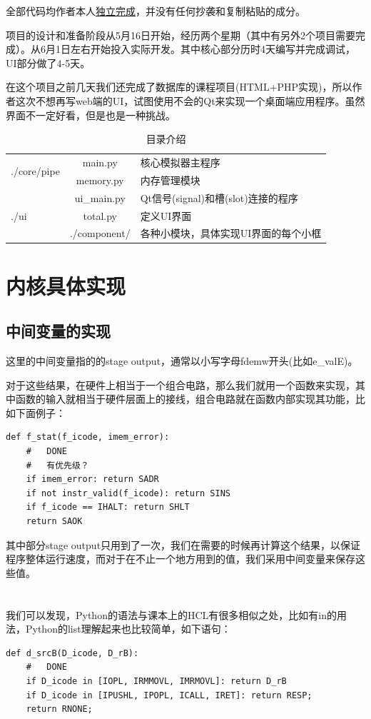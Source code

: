 \documentclass{article}
\begin{document}
全部代码均作者本人\underline{独立完成}，并没有任何抄袭和复制粘贴的成分。

项目的设计和准备阶段从5月16日开始，经历两个星期（其中有另外2个项目需要完成）。从6月1日左右开始投入实际开发。其中核心部分历时4天编写并完成调试，UI部分做了4-5天。

在这个项目之前几天我们还完成了数据库的课程项目(HTML+PHP实现)，所以作者这次不想再写web端的UI，试图使用不会的Qt来实现一个桌面端应用程序。虽然界面不一定好看，但是也是一种挑战。


\begin{center}
\begin{table}[!ht]     %
\centering
\caption{目录介绍}
\large
\begin{tabular}{|l|c|l|}
\hline
\multirow{2}{*}{./core/pipe} & main.py & 核心模拟器主程序\\
\cline{2-3}
& memory.py & 内存管理模块\\
\hline
\multirow{3}{*}{./ui} & ui\_main.py & Qt信号(signal)和槽(slot)连接的程序\\
\cline{2-3}
& total.py & 定义UI界面\\
\cline{2-3}
& ./component/ & 各种小模块，具体实现UI界面的每个小框\\
\hline
\end{tabular}
\end{table}
\end{center}

\section{内核具体实现}
\subsection{中间变量的实现}
这里的中间变量指的的stage output，通常以小写字母fdemw开头(比如e\_valE)。

对于这些结果，在硬件上相当于一个组合电路，那么我们就用一个函数来实现，其中函数的输入就相当于硬件层面上的接线，组合电路就在函数内部实现其功能，比如下面例子：

\begin{lstlisting}[frame=single]
def f_stat(f_icode, imem_error):
    #   DONE
    #   有优先级？
    if imem_error: return SADR
    if not instr_valid(f_icode): return SINS
    if f_icode == IHALT: return SHLT
    return SAOK

\end{lstlisting}

其中部分stage output只用到了一次，我们在需要的时候再计算这个结果，以保证程序整体运行速度，而对于在不止一个地方用到的值，我们采用中间变量来保存这些值。
\\
\\
\\
\indent 我们可以发现，Python的语法与课本上的HCL有很多相似之处，比如有in的用法，Python的list理解起来也比较简单，如下语句：
\begin{lstlisting}[frame=single]
def d_srcB(D_icode, D_rB):
    #   DONE
    if D_icode in [IOPL, IRMMOVL, IMRMOVL]: return D_rB
    if D_icode in [IPUSHL, IPOPL, ICALL, IRET]: return RESP;
    return RNONE;
\end{lstlisting}
\end{document}
